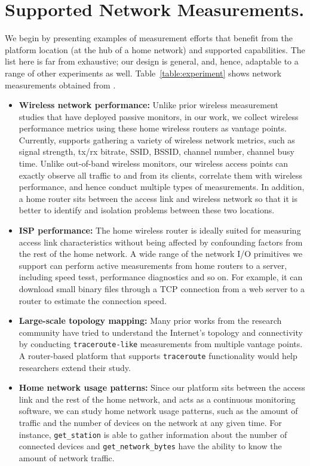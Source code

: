 {\section{Supported Network Measurements.}
\label{sec.network_measurement}
We begin by presenting examples of measurement efforts that benefit from the platform
 location (at the hub of a home network) and supported capabilities. The list
 here is far from exhaustive; our design is general, and, hence, adaptable to a range
  of other experiments as well. Table~\ref{table:experiment} shows network
  measurements obtained from \sysname.

\begin{itemize}
\item \textbf{Wireless network performance:} Unlike prior wireless measurement studies
that have deployed passive
monitors\cite{mahajan2006analyzing}\cite{raghavendra2009wi}\cite{papagiannaki2006experimental},
in our work, we collect wireless performance metrics using these home wireless
routers as vantage points. Currently, \sysname supports gathering a variety of
 wireless network metrics, such as signal strength, tx/rx bitrate, SSID, BSSID,
 channel number, channel busy time.  Unlike out-of-band wireless monitors, our wireless
  access points can exactly observe all traffic to and from its clients,
  correlate them with wireless performance, and hence conduct multiple types of measurements.
  In addition, a home router sits between the access link and wireless network
  so that it is better to identify and isolation problems between these two locations.

\item \textbf{ISP performance:} The home wireless router is ideally suited for
measuring access link characteristics without being affected by confounding factors from the rest of the
home network. A wide range of the network I/O primitives we support can perform active measurements
from home routers to a server, including speed tesst, performance diagnostics and so on. For example,
it can download small binary files through a TCP connection from a web server to a router
 to estimate the connection speed.

\item \textbf{Large-scale topology mapping:} Many prior works from the research
 community have tried to understand the Internet's topology and connectivity by
  conducting \texttt{traceroute-like} measurements from multiple
  vantage points\cite{paxson1996end}\cite{chen2009sidewalk}. A router-based platform that supports
   \texttt{traceroute} functionality would help researchers extend their study.

\item \textbf{Home network usage patterns:} Since our platform sits between the
access link and the rest of the home network, and acts as a continuous monitoring
software, we can study home network usage patterns, such as the amount of traffic
 and the number of devices on the network at any given time. For instance, \texttt{get\_station}
 is able to gather information about the number of connected devices and
  \texttt{get\_network\_bytes} have the ability to know the amount of network traffic.
\end{itemize}
\par}
